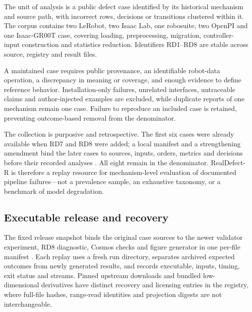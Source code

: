 \documentclass[conference]{IEEEtran}
\begin{document}
The unit of analysis is a public defect case identified by its historical mechanism and source path, with incorrect rows, decisions or transitions clustered within it. The corpus contains two LeRobot, two Isaac Lab, one robosuite, two OpenPI and one Isaac-GR00T case, covering loading, preprocessing, migration, controller-input construction and statistics reduction. Identifiers RD1--RD8 are stable across source, registry and result files.\par

A maintained case requires public provenance, an identifiable robot-data operation, a discrepancy in meaning or coverage, and enough evidence to define reference behavior. Installation-only failures, unrelated interfaces, untraceable claims and author-injected examples are excluded, while duplicate reports of one mechanism remain one case. Failure to reproduce an included case is retained, preventing outcome-based removal from the denominator.\par

The collection is purposive and retrospective. The first six cases were already available when RD7 and RD8 were added; a local manifest and a strengthening amendment bind the later cases to sources, inputs, orders, metrics and decisions before their recorded analyses \cite{13}. All eight remain in the denominator. \mbox{RealDefect-R} is therefore a replay resource for mechanism-level evaluation of documented pipeline failures---not a prevalence sample, an exhaustive taxonomy, or a benchmark of model degradation.\par

\subsection{Executable release and recovery}



The fixed release snapshot binds the original case sources to the newer validator experiment, RD8 diagnostic, Cosmos checks and figure generator in one per-file manifest \cite{13}. Each replay uses a fresh run directory, separates archived expected outcomes from newly generated results, and records executable, inputs, timing, exit status and streams. Pinned upstream downloads and bundled low-dimensional derivatives have distinct recovery and licensing entries in the registry, where full-file hashes, range-read identities and projection digests are not interchangeable.\par
\end{document}
